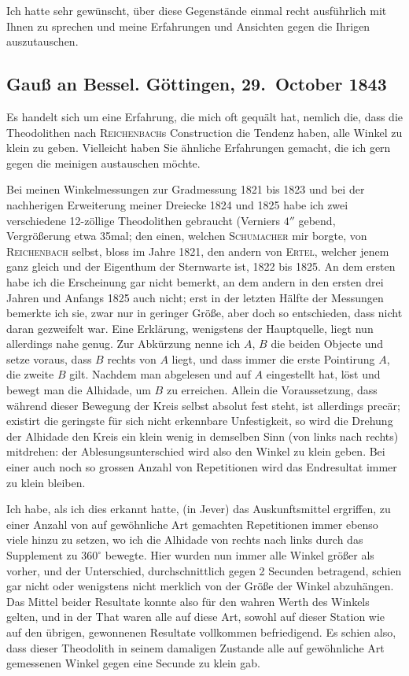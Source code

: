 \documentclass[12pt,a4paper]{article}
\theoremstyle{plain}
\theoremstyle{definition}
\theoremstyle{remark}
\begin{document}
Ich hatte sehr gew\"unscht, \"uber diese Gegenst\"ande einmal recht ausf\"uhrlich mit Ihnen zu sprechen und meine Erfahrungen und Ansichten gegen die Ihrigen auszutauschen.

\subsection*{Gau\ss{} an Bessel. G\"ottingen, 29.\ October 1843}

Es handelt sich um eine Erfahrung, die mich oft gequ\"alt hat, nemlich die, dass die Theodolithen nach \textsc{Reichenbach}s Construction die Tendenz haben, alle Winkel zu klein zu geben. Vielleicht haben Sie \"ahnliche Erfahrungen gemacht, die ich gern gegen die meinigen austauschen m\"ochte.

Bei meinen Winkelmessungen zur Gradmessung 1821 bis 1823 und bei der nachherigen Erweiterung meiner Dreiecke 1824 und 1825 habe ich zwei verschiedene 12-z\"ollige Theodolithen gebraucht (Verniers $4''$ gebend, Vergr\"o\ss erung etwa 35mal; den einen, welchen \textsc{Schumacher} mir borgte, von \textsc{Reichenbach} selbst, bloss im Jahre 1821, den andern von \textsc{Ertel}, welcher jenem ganz gleich und der Eigenthum der Sternwarte ist, 1822 bis 1825. An dem ersten habe ich die Erscheinung gar nicht bemerkt, an dem andern in den ersten drei Jahren und Anfangs 1825 auch nicht; erst in der letzten H\"alfte der Messungen bemerkte ich sie, zwar nur in geringer Gr\"o\ss e, aber doch so entschieden, dass nicht daran gezweifelt war. Eine Erkl\"arung, wenigstens der Hauptquelle, liegt nun allerdings nahe genug. Zur Abk\"urzung nenne ich $A$, $B$ die beiden Objecte und setze voraus, dass $B$ rechts von $A$ liegt, und dass immer die erste Pointirung $A$, die zweite $B$ gilt. Nachdem man abgelesen und auf $A$ eingestellt hat, l\"ost und bewegt man die Alhidade, um $B$ zu erreichen. Allein die Voraussetzung, dass w\"ahrend dieser Bewegung der Kreis selbst absolut fest steht, ist allerdings prec\"ar; existirt die geringste f\"ur sich nicht erkennbare Unfestigkeit, so wird die Drehung der Alhidade den Kreis ein klein wenig in demselben Sinn (von links nach rechts) mitdrehen: der Ablesungsunterschied wird also den Winkel zu klein geben. Bei einer auch noch so grossen Anzahl von Repetitionen wird das Endresultat immer zu klein bleiben.

Ich habe, als ich dies erkannt hatte, (in Jever) das Auskunftsmittel ergriffen, zu einer Anzahl von auf gew\"ohnliche Art gemachten Repetitionen immer ebenso viele hinzu zu setzen, wo ich die Alhidade von rechts nach links durch das Supplement zu $360^{\circ}$ bewegte. Hier wurden nun immer alle Winkel gr\"o\ss er als vorher, und der Unterschied, durchschnittlich gegen 2 Secunden betragend, schien gar nicht oder wenigstens nicht merklich von der Gr\"o\ss e der Winkel abzuh\"angen. Das Mittel beider Resultate konnte also f\"ur den wahren Werth des Winkels gelten, und in der That waren alle auf diese Art, sowohl auf dieser Station wie auf den \"ubrigen, gewonnenen Resultate vollkommen befriedigend. Es schien also, dass dieser Theodolith in seinem damaligen Zustande alle auf gew\"ohnliche Art gemessenen Winkel gegen eine Secunde zu klein gab.
\end{document}
